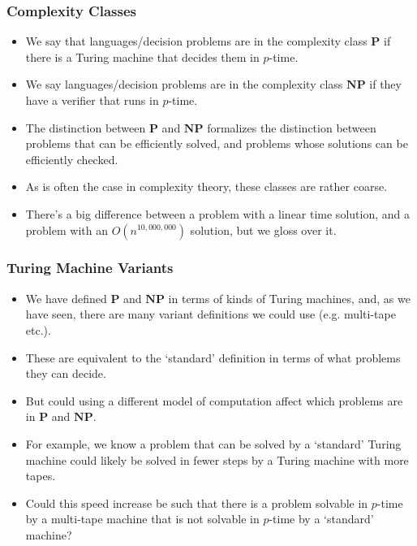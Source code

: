 \documentclass[handout]{beamer}
\newcommand{\Po}{\mathbf{P}}
\newcommand{\NP}{\mathbf{NP}}
\begin{document}
\begin{frame}
\frametitle{Complexity Classes}
\begin{itemize}
\item  We say that languages/decision problems are in the complexity class $\Po$ if there is a Turing machine that decides them in $p$-time. 
\vspace{0.3cm}
\item We say languages/decision problems are in the complexity class $\NP$ if they have a verifier that runs in $p$-time. 
\vspace{0.3cm}
\item The distinction between $\Po$ and $\NP$ formalizes the distinction between problems that can be efficiently solved, and problems whose solutions can be efficiently checked. 
\vspace{0.3cm}
\item As is often the case in complexity theory, these classes are rather coarse. 
\vspace{0.3cm}
\item There's a big difference between a problem with a linear time solution, and a problem with an $O(n^{10,000,000})$ solution, but we gloss over it.
\end{itemize} 
\end{frame}

\begin{frame}
\frametitle{Turing Machine Variants}
\begin{itemize}
\item  We have defined $\Po$ and $\NP$ in terms of kinds of Turing machines, and, as we have seen, there are many variant definitions we could use (e.g. multi-tape etc.). 
\vspace{0.3cm}
\item These are equivalent to the `standard' definition in terms of what problems they can decide. 
\vspace{0.3cm}
\item But could using a different model of computation affect which problems are in $\Po$ and $\NP$. 
\vspace{0.3cm}
\item For example, we know a problem that can be solved by a `standard' Turing machine could likely be solved in fewer steps by a Turing machine with more tapes. 
\vspace{0.3cm}
\item Could this speed increase be such that there is a problem solvable in $p$-time by a multi-tape machine that is not solvable in $p$-time by a `standard' machine? 
\end{itemize} 
\end{frame}
\end{document}
